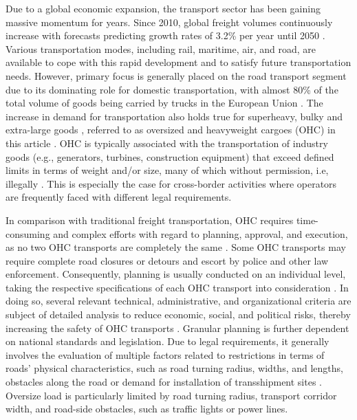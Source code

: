 
Due to a global economic expansion, the transport sector has been gaining massive momentum for years.
Since 2010, global freight volumes continuously increase with forecasts predicting growth rates of 3.2\% per year until 2050 \cite{figura2020preferences, InternationalTransportForum}.
Various transportation modes, including rail, maritime, air, and road, are available to cope with this rapid development and to satisfy future transportation needs.
However, primary focus is generally placed on the road transport segment due to its dominating role for domestic transportation, with almost 80\% of the total volume of goods being carried by trucks in the European Union \cite{Eurostat}.
The increase in demand for transportation also holds true for superheavy, bulky and extra-large goods \cite{gavrilova2021analysis}, referred to as oversized and heavyweight cargoes (OHC) in this article \cite{Luo.2021}.
OHC is typically associated with the transportation of industry goods (e.g., generators, turbines, construction equipment) that exceed defined limits in terms of weight and/or size, many of which without permission, i.e, illegally \cite{fiorillo2016minimizing}. This is especially the case for cross-border activities where operators are frequently faced with different legal requirements. 
\par In comparison with traditional freight transportation, OHC requires time-consuming and complex efforts with regard to planning, approval, and execution, as no two OHC transports are completely the same \cite{Wolnowska.2019}.
Some OHC transports may require complete road closures or detours and escort by police and other law enforcement.
Consequently, planning is usually conducted on an individual level, taking the respective specifications of each OHC transport into consideration \cite{Bazaras.2013}.
In doing so, several relevant technical, administrative, and organizational criteria are subject of detailed analysis to reduce economic, social, and political risks, thereby increasing the safety of OHC transports \cite{Palsaitis.2012}.
Granular planning is further dependent on national standards and legislation. Due to legal requirements, it generally involves the evaluation of multiple factors related to restrictions in terms of roads' physical characteristics, such as road turning radius, widths, and lengths, obstacles along the road or demand for installation of transshipment sites \cite{PETRASKA.2018}.
Oversize load is particularly limited by road turning radius, transport corridor width, and road-side obstacles, such as traffic lights or power lines.
